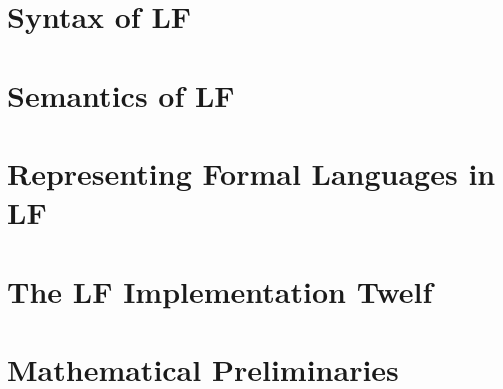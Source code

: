 \documentclass{book}
\begin{document}
\chapter{Syntax of LF}
 

\chapter{Semantics of LF}
 

\chapter{Representing Formal Languages in LF}
  
  
\chapter{The LF Implementation Twelf}\label{sec:twelf}
  

%
%  


\appendix

\chapter{Mathematical Preliminaries}





\end{document}
